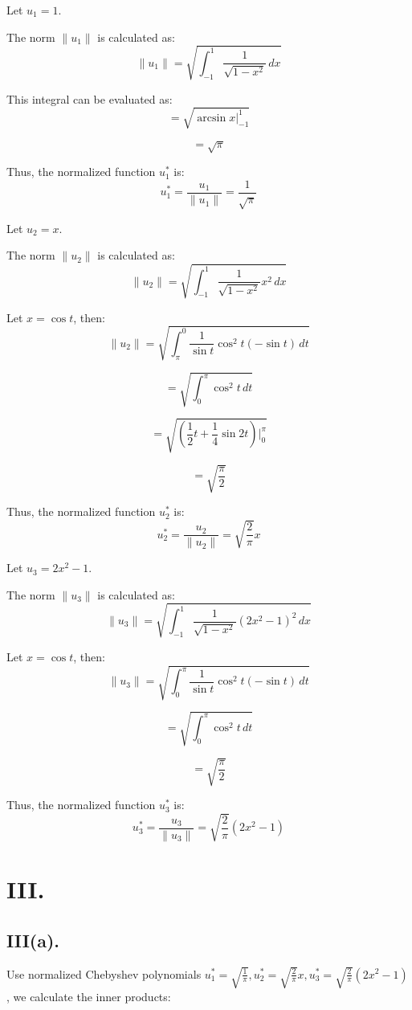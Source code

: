 \documentclass[a4paper]{article}
\begin{document}
Let \( u_1 = 1 \).

The norm \( \|u_1\| \) is calculated as:
\[
\|u_1\| = \sqrt{\int_{-1}^{1} \frac{1}{\sqrt{1-x^2}} \, dx}
\]

This integral can be evaluated as:
\[
= \sqrt{\arcsin x \bigg|_{-1}^{1}}
\]

\[
= \sqrt{\pi}
\]

Thus, the normalized function \( u_1^* \) is:
\[
u_1^* = \frac{u_1}{\|u_1\|} = \frac{1}{\sqrt{\pi}}
\]

Let \( u_2 = x \).

The norm \( \|u_2\| \) is calculated as:
\[
\|u_2\| = \sqrt{\int_{-1}^{1} \frac{1}{\sqrt{1-x^2}} x^2 \, dx}
\]

Let \( x = \cos t \), then:
\[
\|u_2\| = \sqrt{\int_{\pi}^{0} \frac{1}{\sin t} \cos^2 t (-\sin t) \, dt}
\]

\[
= \sqrt{\int_{0}^{\pi} \cos^2 t \, dt}
\]

\[
= \sqrt{\left( \frac{1}{2} t + \frac{1}{4} \sin 2t \right) \bigg|_{0}^{\pi}}
\]

\[
= \sqrt{\frac{\pi}{2}}
\]

Thus, the normalized function \( u_2^* \) is:
\[
u_2^* = \frac{u_2}{\|u_2\|} = \sqrt{\frac{2}{\pi}} x
\]

Let \( u_3 = 2x^2 - 1 \).

The norm \( \|u_3\| \) is calculated as:
\[
\|u_3\| = \sqrt{\int_{-1}^{1} \frac{1}{\sqrt{1-x^2}} (2x^2 - 1)^2 \, dx}
\]

Let \( x = \cos t \), then:
\[
\|u_3\| = \sqrt{\int_{0}^{\pi} \frac{1}{\sin t} \cos^2 t (-\sin t) \, dt}
\]

\[
= \sqrt{\int_{0}^{\pi} \cos^2 t \, dt}
\]

\[
= \sqrt{\frac{\pi}{2}}
\]

Thus, the normalized function \( u_3^* \) is:
\[
u_3^* = \frac{u_3}{\|u_3\|} = \sqrt{\frac{2}{\pi}} (2x^2 - 1)
\]

\section*{III.}

\subsection*{III(a).}
Use normalized Chebyshev polynomials \( u_1^* = \sqrt{\frac{1}{\pi}}, u_2^* = \sqrt{\frac{2}{\pi}} x, u_3^* = \sqrt{\frac{2}{\pi}} (2x^2 - 1) \), we calculate the inner products:
\end{document}
